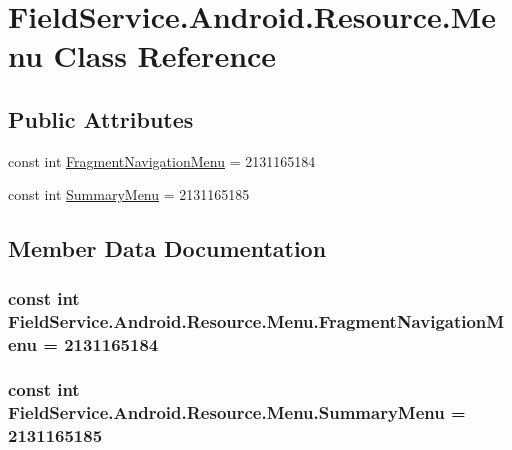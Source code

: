\hypertarget{class_field_service_1_1_android_1_1_resource_1_1_menu}{\section{Field\+Service.\+Android.\+Resource.\+Menu Class Reference}
\label{class_field_service_1_1_android_1_1_resource_1_1_menu}
}
\subsection*{Public Attributes}
\begin{DoxyCompactItemize}
\item 
const int \hyperlink{class_field_service_1_1_android_1_1_resource_1_1_menu_aa187f9835aa1e6542af329aaac6128bf}{Fragment\+Navigation\+Menu} = 2131165184
\item 
const int \hyperlink{class_field_service_1_1_android_1_1_resource_1_1_menu_aae37127ca3678f60d772c8abfb76793f}{Summary\+Menu} = 2131165185
\end{DoxyCompactItemize}


\subsection{Member Data Documentation}
\hypertarget{class_field_service_1_1_android_1_1_resource_1_1_menu_aa187f9835aa1e6542af329aaac6128bf}{
\subsubsection[{Fragment\+Navigation\+Menu}]{\setlength{\rightskip}{0pt plus 5cm}const int Field\+Service.\+Android.\+Resource.\+Menu.\+Fragment\+Navigation\+Menu = 2131165184}}\label{class_field_service_1_1_android_1_1_resource_1_1_menu_aa187f9835aa1e6542af329aaac6128bf}
\hypertarget{class_field_service_1_1_android_1_1_resource_1_1_menu_aae37127ca3678f60d772c8abfb76793f}{
\subsubsection[{Summary\+Menu}]{\setlength{\rightskip}{0pt plus 5cm}const int Field\+Service.\+Android.\+Resource.\+Menu.\+Summary\+Menu = 2131165185}}\label{class_field_service_1_1_android_1_1_resource_1_1_menu_aae37127ca3678f60d772c8abfb76793f}


